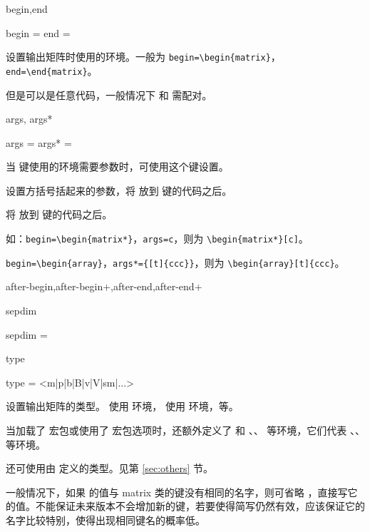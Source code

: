 \documentclass{ctxdoc}
\begin{document}
\begin{function}{begin,end}
    \begin{syntax}
        begin = 
        end   = 
    \end{syntax}
    设置输出矩阵时使用的环境。一般为 \verb|begin=\begin{matrix}|，
    \verb|end=\end{matrix}|。

    但是可以是任意代码，一般情况下  和  需配对。
\end{function}

\begin{function}{args, args*}
    \begin{syntax}
        args  = 
        args* = 
    \end{syntax}
    当  键使用的环境需要参数时，可使用这个键设置。

     设置方括号括起来的参数，将  放到  键的代码之后。

     将  放到  键的代码之后。

    如：\verb|begin=\begin{matrix*}|，\verb|args=c|，则为 \verb|\begin{matrix*}[c]|。

    \verb|begin=\begin{array}|，\verb|args*={[t]{ccc}}|，则为 \verb|\begin{array}[t]{ccc}|。
\end{function}

\begin{function}{after-begin,after-begin+,after-end,after-end+}
\end{function}

\begin{function}{sepdim}
    \begin{syntax}
        sepdim =  \init{0pt}
    \end{syntax}
\end{function}

\begin{function}{type}
    \begin{syntax}
        type = <m|p|b|B|v|V|sm|...> 
    \end{syntax}
    设置输出矩阵的类型。 使用  环境， 使用  环境，等。

    当加载了  宏包或使用了  宏包选项时，还额外定义了  和 、、 等环境，它们代表 、、 等环境。

    还可使用由  定义的类型。见第 \ref{sec:others} 节。

    一般情况下，如果  的值与 matrix 类的键没有相同的名字，则可省略 ，直接写它的值。不能保证未来版本不会增加新的键，若要使得简写仍然有效，应该保证它的名字比较特别，使得出现相同键名的概率低。
\end{function}
\end{document}
